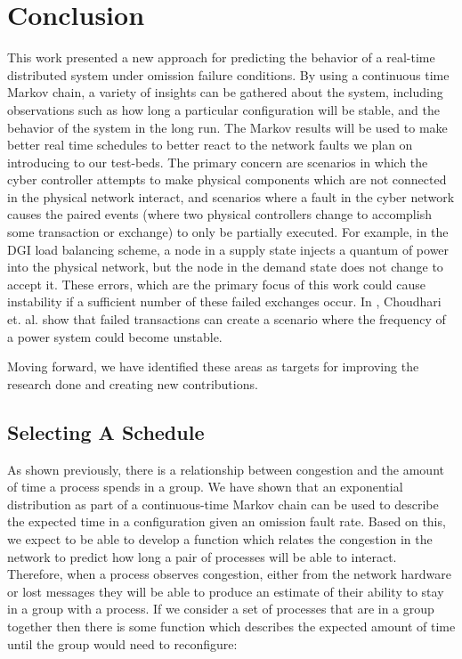 \chapter{Conclusion}

This work presented a new approach for predicting the behavior of a real-time distributed system under omission failure conditions.
By using a continuous time Markov chain, a variety of insights can be gathered about the system, including observations such as how long a particular configuration will be stable, and the behavior of the system in the long run. 
The Markov results will be used  to make better real time schedules to better react to the network faults we plan on introducing to our test-beds.
The primary concern are scenarios in which the cyber controller attempts to make physical components which are not connected in the physical network interact, and scenarios where a fault in the cyber network causes the paired events (where two physical controllers change to accomplish some transaction or exchange) to only be partially executed.
For example, in the DGI load balancing scheme, a node in a supply state injects a quantum of power into the physical network, but the node in the demand state does not change to accept it.
These errors, which are the primary focus of this work could cause instability if a sufficient number of these failed exchanges occur. In \cite{HARINI}, Choudhari et. al. show that failed transactions can create a scenario where the frequency of a power system could become unstable. 

Moving forward, we have identified these areas as targets for improving the research done and creating new contributions.

\section{Selecting A Schedule}

As shown previously, there is a relationship between congestion and the amount of time a process spends in a group.
We have shown that an exponential distribution as part of a continuous-time Markov chain can be used to describe the expected time in a configuration given an omission fault rate.
Based on this, we expect to be able to develop a function which relates the congestion in the network to predict how long a pair of processes will be able to interact.
Therefore, when a process observes congestion, either from the network hardware or lost messages they will be able to produce an estimate of their ability to stay in a group with a process.
If we consider a set of processes that are in a group together then there is some function which describes the expected amount of time until the group would need to reconfigure:

